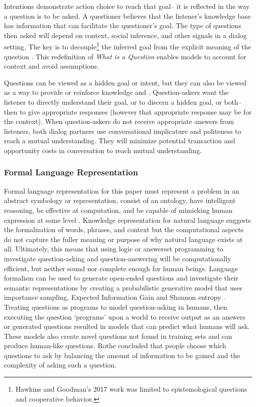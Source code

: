 Intentions demonstrate action choice to reach that goal-- it is reflected in the way a question is to be asked. A questioner believes that the listener’s knowledge base has information that can facilitate the questioner’s goal. 
The type of questions then asked will depend on context, social inference, and other signals in a dialog setting. The key is to 
decouple\footnote{Hawkins and Goodman's 2017 work was limited to epistemological questions and cooperative behavior.} the inferred goal from the explicit meaning of the question \citet{hawkins_goodman_2017}. This redefinition of \emph{What is a Question} enables models to account for context and avoid assumptions. 

Questions can be viewed as a hidden goal or intent, but they can also be viewed as a way to provide or reinforce knowledge \citet{alaimi_2020} and \citet{ray_2001}. Question-askers want the listener to directly understand their goal, or to discern a hidden goal, or both-- then to give appropriate responses (however that appropriate response may be for the context). When question-askers do not receive appropriate answers from listeners, both dialog partners use conversational implicature and politeness to reach a mutual understanding. They will minimize potential transaction and opportunity costs in conversation to reach mutual understanding.  

\subsubsection{Formal Language Representation}
Formal language representation for this paper must represent a problem in an abstract symbology or representation, consist of an ontology, have intelligent reasoning, be effective at computation, and be capable of mimicking human expression at some level \citet{DavisR}. Knowledge representation for natural language suggests the formalization of words, phrases, and context but the computational aspects do not capture the fuller meaning or purpose of why natural language exists at all. Ultimately, this means that using logic or answerset programming to investigate question-asking and question-answering will be computationally efficient, but neither sound nor complete enough for human beings. Language formalism can be used to generate open-ended questions and investigate their semantic representations by creating a probabilistic generative model that uses importance sampling, Expected Information Gain and Shannon entropy \citet{rothe_lake_gureckis_2017}. Treating questions as programs to model question-asking in humans, then executing the question ‘programs’ upon a world to receive output as an answers or generated questions resulted in models that can predict what humans will ask. These models also create novel questions not found in training sets and can produce human-like questions\citet{rothe_lake_gureckis_2017}. Rothe concluded that people choose which questions to ask by balancing the amount of information to be gained and the complexity of asking such a question. 

